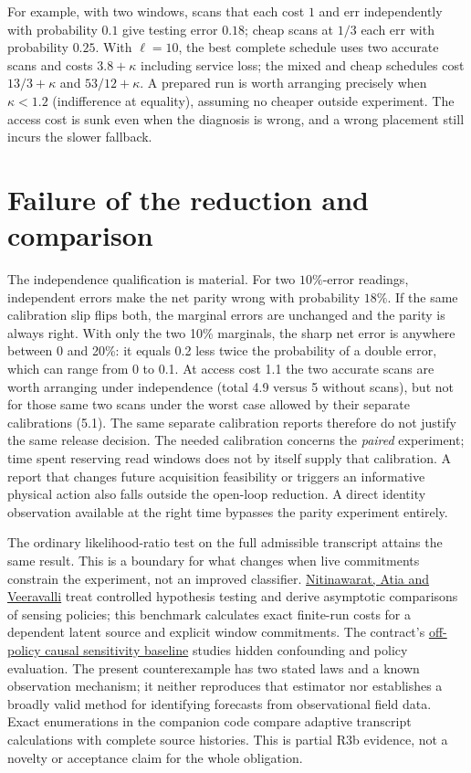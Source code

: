 \documentclass[11pt]{article}
\begin{document}
For example, with two windows, scans that each cost \(1\) and
err independently with probability \(0.1\) give testing error
\(0.18\); cheap scans at \(1/3\) each err with probability \(0.25\).
With \(\ell=10\), the best complete schedule uses two accurate
scans and costs \(3.8+\kappa\) including service loss; the mixed
and cheap schedules cost \(13/3+\kappa\) and \(53/12+\kappa\).
A prepared run is worth arranging precisely when \(\kappa<1.2\)
(indifference at equality), assuming no cheaper outside experiment.
The access cost is sunk even when the diagnosis is wrong, and
a wrong placement still incurs the slower fallback.

\section{Failure of the reduction and comparison}

The independence qualification is material. For two \(10\%\)-error
readings, independent errors make the net parity wrong with
probability \(18\%\). If the same calibration slip flips both,
the marginal errors are unchanged and the parity is always right.
With only the two 10\% marginals, the sharp net error is anywhere
between 0 and 20\%: it equals 0.2 less twice the probability of
a double error, which can range from 0 to 0.1. At access cost
1.1 the two accurate scans are worth arranging under independence
(total 4.9 versus 5 without scans), but not for those same two scans
under the worst case allowed by their separate calibrations (5.1).
The same separate calibration reports therefore do not justify
the same release decision. The needed calibration concerns the
\emph{paired} experiment; time spent reserving read windows does
not by itself supply that calibration. A report that changes
future acquisition feasibility or triggers an informative physical
action also falls outside the open-loop reduction. A direct
identity observation available at the right time bypasses the
parity experiment entirely.

The ordinary likelihood-ratio test on the full admissible
transcript attains the same result. This is a boundary for what
changes when live commitments constrain the experiment, not an
improved classifier. \href{https://arxiv.org/abs/1205.0858}{Nitinawarat,
Atia and Veeravalli} treat controlled hypothesis testing and
derive asymptotic comparisons of sensing policies; this benchmark
calculates exact finite-run costs for a dependent latent source and
explicit window commitments. The contract's
\href{https://proceedings.mlr.press/v286/marmarelis25a.html}{off-policy
causal sensitivity baseline} studies hidden confounding and policy
evaluation. The present counterexample has two stated laws and a
known observation mechanism; it neither reproduces that estimator
nor establishes a broadly valid method for identifying forecasts
from observational field data. Exact enumerations in the companion
code compare adaptive transcript calculations with complete source
histories. This is partial R3b evidence, not a novelty or acceptance
claim for the whole obligation.
\end{document}
